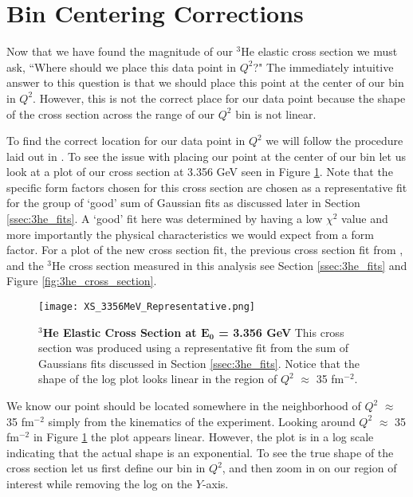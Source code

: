 \section{Bin Centering Corrections}
\label{sec:bin_cor}

Now that we have found the magnitude of our $^3$He elastic cross section we must ask, ``Where should we place this data point in $Q^2$?" The immediately intuitive answer to this question is that we should place this point at the center of our bin in $Q^2$. However, this is not the correct place for our data point because the shape of the cross section across the range of our $Q^2$ bin is not linear.
 
To find the correct location for our data point in $Q^2$ we will follow the procedure laid out in \cite{Article:data_placement}. To see the issue with placing our point at the center of our bin let us look at a plot of our cross section at 3.356 GeV seen in Figure \ref{fig:xs_bin}. Note that the specific form factors chosen for this cross section are chosen as a representative fit for the group of `good' sum of Gaussian fits as discussed later in Section \ref{ssec:3he_fits}. A `good' fit here was determined by having a low $\chi^2$ value and more importantly the physical characteristics we would expect from a form factor. For a plot of the new cross section fit, the previous cross section fit from \cite{Article:Amroun}, and the $^3$He cross section measured in this analysis see Section \ref{ssec:3he_fits} and Figure \ref{fig:3he_cross_section}.

\begin{figure}[!ht]
\begin{center}
\texttt{[image: XS\_3356MeV\_Representative.png]}
\end{center}
\caption[$^3$He Elastic Cross Section at $E_0$ = 3.356 GeV]{
{\bf{$^3$He Elastic Cross Section at $\boldsymbol{E_0}$ = 3.356 GeV}} This cross section was produced using a representative fit from the sum of Gaussians fits discussed in Section \ref{ssec:3he_fits}. Notice that the shape of the log plot looks linear in the region of $Q^2$ $\approx$ 35 fm$^{-2}$.}
\label{fig:xs_bin}
\end{figure}

We know our point should be located somewhere in the neighborhood of $Q^2$ $\approx$ 35 fm$^{-2}$ simply from the kinematics of the experiment. Looking around $Q^2$ $\approx$ 35 fm$^{-2}$ in Figure \ref{fig:xs_bin} the plot appears linear. However, the plot is in a log scale indicating that the actual shape is an exponential. To see the true shape of the cross section let us first define our bin in $Q^2$, and then zoom in on our region of interest while removing the log on the $Y$-axis. 

